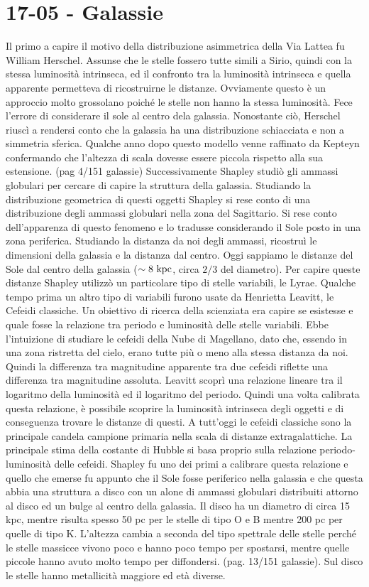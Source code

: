 \section*{17-05 - Galassie}
Il primo a capire il motivo della distribuzione asimmetrica della Via Lattea fu William Herschel. Assunse che le stelle fossero tutte simili a Sirio, quindi con la stessa luminosità intrinseca, ed il confronto tra la luminosità intrinseca e quella apparente permetteva di ricostruirne le distanze. Ovviamente questo è un approccio molto grossolano poiché le stelle non hanno la stessa luminosità. Fece l'errore di considerare il sole al centro dela galassia. Nonostante ciò, Herschel riuscì a rendersi conto che la galassia ha una distribuzione schiacciata e non a simmetria sferica. Qualche anno dopo questo modello venne raffinato da Kepteyn confermando che l'altezza di scala dovesse essere piccola rispetto alla sua estensione. (pag 4/151 galassie) Successivamente Shapley studiò gli ammassi globulari per cercare di capire la struttura della galassia. Studiando la distribuzione geometrica di questi oggetti Shapley si rese conto di una distribuzione degli ammassi globulari nella zona del Sagittario. Si rese conto dell'apparenza di questo fenomeno e lo tradusse considerando il Sole posto in una zona periferica. Studiando la distanza da noi degli ammassi, ricostruì le dimensioni della galassia e la distanza dal centro. Oggi sappiamo le distanze del Sole dal centro della galassia ($\sim 8\text{ kpc}$, circa $2/3$ del diametro). Per capire queste distanze Shapley utilizzò un particolare tipo di stelle variabili, le Lyrae. Qualche tempo prima un altro tipo di variabili furono usate da Henrietta Leavitt, le Cefeidi classiche. Un obiettivo di ricerca della scienziata era capire se esistesse e quale fosse la relazione tra periodo e luminosità delle stelle variabili. Ebbe l'intuizione di studiare le cefeidi della Nube di Magellano, dato che, essendo in una zona ristretta del cielo, erano tutte più o meno alla stessa distanza da noi. Quindi la differenza tra magnitudine apparente tra due cefeidi riflette una differenza tra magnitudine assoluta. Leavitt scoprì una relazione lineare tra il logaritmo della luminosità ed il logaritmo del periodo. Quindi una volta calibrata questa relazione, è possibile scoprire la luminosità intrinseca degli oggetti e di conseguenza trovare le distanze di questi. A tutt'oggi le cefeidi classiche sono la principale candela campione primaria nella scala di distanze extragalattiche. La principale stima della costante di Hubble si basa proprio sulla relazione periodo-luminosità delle cefeidi. Shapley fu uno dei primi a calibrare questa relazione e quello che emerse fu appunto che il Sole fosse periferico nella galassia e che questa abbia una struttura a disco con un alone di ammassi globulari distribuiti attorno al disco ed un bulge al centro della galassia. Il disco ha un diametro di circa 15 kpc, mentre risulta spesso 50 pc per le stelle di tipo O e B mentre 200 pc per quelle di tipo K. L'altezza cambia a seconda del tipo spettrale delle stelle perché le stelle massicce vivono poco e hanno poco tempo per spostarsi, mentre quelle piccole hanno avuto molto tempo per diffondersi. (pag. 13/151 galassie). Sul disco le stelle hanno metallicità maggiore ed età diverse.\\
